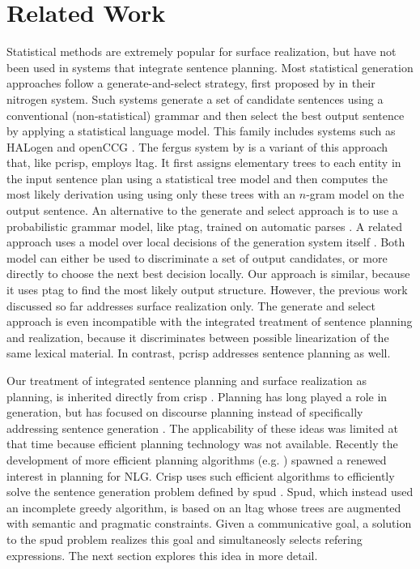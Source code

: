 \section{Related Work}
\label{sec:related}
Statistical methods are extremely popular for surface realization, but have not been used in systems that integrate sentence planning. Most statistical generation approaches follow a generate-and-select strategy, first proposed by  in their {\sc nitrogen} system. Such systems generate a set of candidate sentences using a conventional (non-statistical) grammar and then select the best output sentence by applying a statistical language model. This family includes systems such as {\sc HAL}ogen \cite{langkildeknight1998,langkilde2000} and open{\sc CCG} \cite{whitebaldridge2003}.  The {\sc fergus} system by  is a variant of this approach that, like {\sc pcrisp}, employs {\sc ltag}. It first assigns elementary trees to each entity in the input sentence plan using a statistical tree model and then computes the most likely derivation using using only these trees with an $n$-gram model on the output sentence. An alternative to the generate and select approach is to use a probabilistic grammar model, like {\sc ptag}, trained on automatic parses \cite{zhongstent2005}. A related approach uses a model over local decisions of the generation system itself \cite{belz2008}. Both model can either be used to discriminate a set of output candidates, or more directly to choose the next best decision locally. Our approach is similar, because it uses {\sc ptag} to find the most likely output structure. However, the previous work discussed so far addresses surface realization only.
The generate and select approach is even incompatible with the integrated treatment of sentence planning and realization, because it discriminates between possible linearization of the same lexical material. In contrast, {\sc pcrisp} addresses sentence planning as well.

Our treatment of integrated sentence planning and surface realization as planning, is inherited directly from {\sc crisp} \cite{kollerstone2007}.  Planning has long played a role in generation, but has focused on discourse planning instead of specifically addressing sentence generation \cite{hovy1988,appelt1992}. The applicability of these ideas was limited at that time because efficient planning technology was not available. Recently the development of more efficient planning algorithms (e.g. ) spawned a renewed interest in planning for NLG.  
{\sc Crisp} uses such efficient algorithms to efficiently solve the sentence generation problem defined by {\sc spud} \cite{stonedoran1997}. {\sc Spud}, which instead used an incomplete greedy algorithm, is based on an {\sc ltag} whose trees are augmented with semantic and pragmatic constraints. Given a communicative goal, a solution to the {\sc spud} problem realizes this goal and simultaneosly selects refering expressions. The next section explores this idea in more detail.
